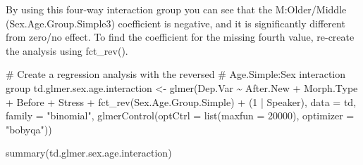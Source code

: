 \documentclass[
  10pt,
  letterpaper]{article}
\newenvironment{Shaded}{\begin{snugshade}}{\end{snugshade}}
\newcommand{\AttributeTok}[1]{\textcolor[rgb]{0.40,0.45,0.13}{#1}}
\newcommand{\CommentTok}[1]{\textcolor[rgb]{0.37,0.37,0.37}{#1}}
\newcommand{\DecValTok}[1]{\textcolor[rgb]{0.68,0.00,0.00}{#1}}
\newcommand{\FunctionTok}[1]{\textcolor[rgb]{0.28,0.35,0.67}{#1}}
\newcommand{\NormalTok}[1]{\textcolor[rgb]{0.00,0.23,0.31}{#1}}
\newcommand{\OtherTok}[1]{\textcolor[rgb]{0.00,0.23,0.31}{#1}}
\newcommand{\SpecialCharTok}[1]{\textcolor[rgb]{0.37,0.37,0.37}{#1}}
\newcommand{\StringTok}[1]{\textcolor[rgb]{0.13,0.47,0.30}{#1}}
\renewcommand\texttt[1]{{\ttfamily\color{BrickRed}#1}}
\begin{document}
By using this four-way interaction group you can see that the
\texttt{M:Older/Middle} (\texttt{Sex.Age.Group.Simple3}) coefficient is
negative, and it is significantly different from zero/no effect. To find
the coefficient for the missing fourth value, re-create the analysis
using \texttt{fct\_rev()}.

\begin{Shaded}
\begin{Highlighting}[]
\CommentTok{\# Create a regression analysis with the reversed}
\CommentTok{\# Age.Simple:Sex interaction group}
\NormalTok{td.glmer.sex.age.interaction }\OtherTok{\textless{}{-}} \FunctionTok{glmer}\NormalTok{(Dep.Var }\SpecialCharTok{\textasciitilde{}}\NormalTok{ After.New }\SpecialCharTok{+}
\NormalTok{    Morph.Type }\SpecialCharTok{+}\NormalTok{ Before }\SpecialCharTok{+}\NormalTok{ Stress }\SpecialCharTok{+} \FunctionTok{fct\_rev}\NormalTok{(Sex.Age.Group.Simple) }\SpecialCharTok{+}
\NormalTok{    (}\DecValTok{1} \SpecialCharTok{|}\NormalTok{ Speaker), }\AttributeTok{data =}\NormalTok{ td, }\AttributeTok{family =} \StringTok{"binomial"}\NormalTok{,}
    \FunctionTok{glmerControl}\NormalTok{(}\AttributeTok{optCtrl =} \FunctionTok{list}\NormalTok{(}\AttributeTok{maxfun =} \DecValTok{20000}\NormalTok{), }\AttributeTok{optimizer =} \StringTok{"bobyqa"}\NormalTok{))}

\FunctionTok{summary}\NormalTok{(td.glmer.sex.age.interaction)}
\end{Highlighting}
\end{Shaded}
\end{document}
